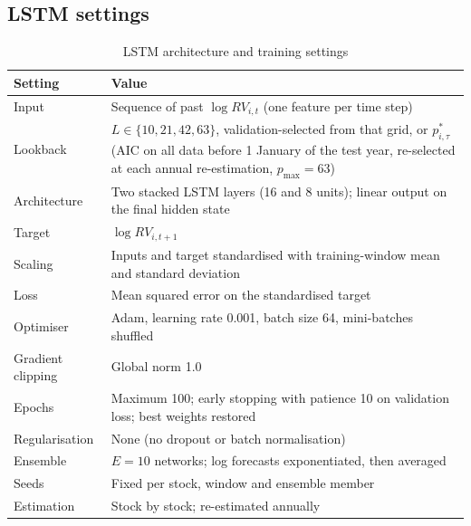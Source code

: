 \documentclass[12pt]{article}
\begin{document}
\clearpage
\printbibliography

\begin{appendices}

\section{LSTM settings}

\begin{table}[!htbp]
\centering
\caption{LSTM architecture and training settings}
\label{tab:hyper}
\small
\renewcommand{\arraystretch}{1.05}
\begin{tabular}{@{}lp{11.2cm}@{}}
\toprule
Setting & Value \\
\midrule
Input & Sequence of past $\log RV_{i,t}$ (one feature per time step) \\
Lookback & $L\in\{10,21,42,63\}$, validation-selected from that grid, or $p^{*}_{i,\tau}$ (AIC on all data before 1 January of the test year, re-selected at each annual re-estimation, $p_{\max}=63$) \\
Architecture & Two stacked LSTM layers (16 and 8 units); linear output on the final hidden state \\
Target & $\log RV_{i,t+1}$ \\
Scaling & Inputs and target standardised with training-window mean and standard deviation \\
Loss & Mean squared error on the standardised target \\
Optimiser & Adam, learning rate 0.001, batch size 64, mini-batches shuffled \\
Gradient clipping & Global norm 1.0 \\
Epochs & Maximum 100; early stopping with patience 10 on validation loss; best weights restored \\
Regularisation & None (no dropout or batch normalisation) \\
Ensemble & $E=10$ networks; log forecasts exponentiated, then averaged \\
Seeds & Fixed per stock, window and ensemble member \\
Estimation & Stock by stock; re-estimated annually \\
\bottomrule
\end{tabular}
\end{table}

\end{appendices}
\end{document}
